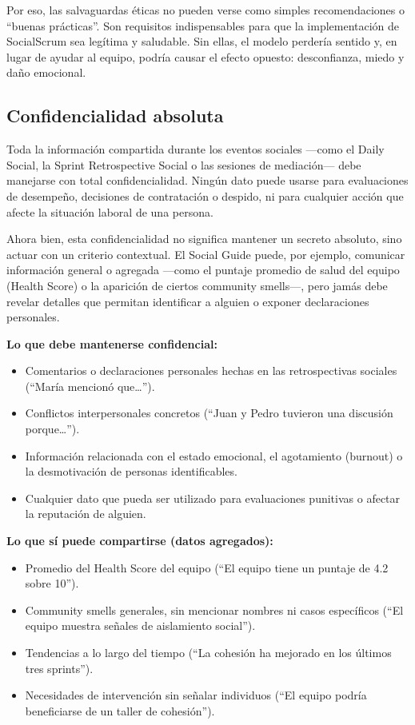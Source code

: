 Por eso, las salvaguardas éticas no pueden verse como simples recomendaciones o ``buenas prácticas''. Son requisitos indispensables para que la implementación de SocialScrum sea legítima y saludable. Sin ellas, el modelo perdería sentido y, en lugar de ayudar al equipo, podría causar el efecto opuesto: desconfianza, miedo y daño emocional.

\subsection{Confidencialidad absoluta}

Toda la información compartida durante los eventos sociales —como el Daily Social, la Sprint Retrospective Social o las sesiones de mediación— debe manejarse con total confidencialidad. Ningún dato puede usarse para evaluaciones de desempeño, decisiones de contratación o despido, ni para cualquier acción que afecte la situación laboral de una persona.

Ahora bien, esta confidencialidad no significa mantener un secreto absoluto, sino actuar con un criterio contextual. El Social Guide puede, por ejemplo, comunicar información general o agregada —como el puntaje promedio de salud del equipo (Health Score) o la aparición de ciertos community smells—, pero jamás debe revelar detalles que permitan identificar a alguien o exponer declaraciones personales.

\textbf{Lo que debe mantenerse confidencial:}
\begin{itemize}
    \item Comentarios o declaraciones personales hechas en las retrospectivas sociales (``María mencionó que…'').
    \item Conflictos interpersonales concretos (``Juan y Pedro tuvieron una discusión porque…'').
    \item Información relacionada con el estado emocional, el agotamiento (burnout) o la desmotivación de personas identificables.
    \item Cualquier dato que pueda ser utilizado para evaluaciones punitivas o afectar la reputación de alguien.
\end{itemize}

\textbf{Lo que sí puede compartirse (datos agregados):}
\begin{itemize}
    \item Promedio del Health Score del equipo (``El equipo tiene un puntaje de 4.2 sobre 10'').
    \item Community smells generales, sin mencionar nombres ni casos específicos (``El equipo muestra señales de aislamiento social'').
    \item Tendencias a lo largo del tiempo (``La cohesión ha mejorado en los últimos tres sprints'').
    \item Necesidades de intervención sin señalar individuos (``El equipo podría beneficiarse de un taller de cohesión'').
\end{itemize}

